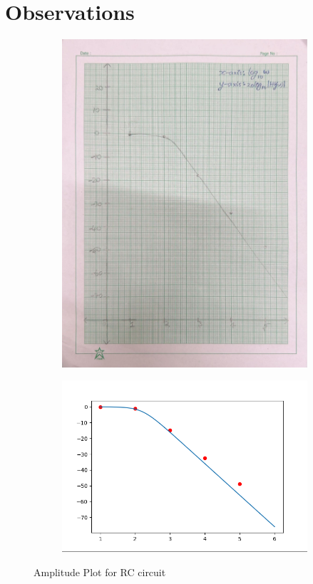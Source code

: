 \documentclass{article}
\begin{document}
\section{Observations}
\begin{figure}[H]
    \centering
    \begin{subfigure}[b]{0.45\textwidth}
        \centering
        \includegraphics[width=\textwidth]{figs/ampl1.png}
    \end{subfigure}
    \hfill
    \begin{subfigure}[b]{0.45\textwidth}
        \centering
        \includegraphics[width=1.7\textwidth]{figs/ampl_1cas.png}
    \end{subfigure}
    
    \caption{Amplitude Plot for RC circuit}
\end{figure}
\end{document}
